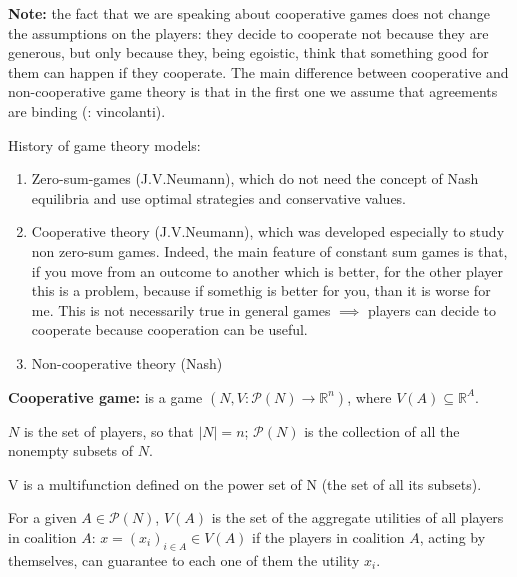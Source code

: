 
%



\bigskip
\noindent \textbf{Note:} the fact that we are speaking about cooperative 
games does not change the assumptions on the players: they decide to 
cooperate not because they are generous, but only because they, being 
egoistic, think that something good for them can happen if they cooperate. 
The main difference between cooperative and non-cooperative game theory is that 
in the first one we assume that agreements are binding (: vincolanti).

\noindent History of game theory models:
\begin{enumerate}
	\item Zero-sum-games (J.V.Neumann), which do not need the concept of 
		Nash equilibria and use optimal strategies and conservative 
		values.
	\item Cooperative theory (J.V.Neumann), which was developed especially 
		to study non zero-sum games. Indeed, the main feature of 
		constant sum games is that, if you move from an outcome to 
		another which is better, for the other player this is a 
		problem, because if somethig is better for you, than it is 
		worse for me. This is not necessarily true in general games 
		$\implies$ players can decide to cooperate because cooperation can 
		be useful.
	\item Non-cooperative theory (Nash)
\end{enumerate}

\bigskip
\noindent \textbf{Cooperative game:} is a game $(N,V: \mathcal{P}(N) \rightarrow \mathbb{R}^n)$, where $V(A) \subseteq \mathbb{R}^A$.

\noindent $N$ is the set of players, so that $|N| = n$; $\mathcal{P}(N)$ is the collection of all the nonempty subsets of $N$.

\noindent V is a multifunction defined on the power set of N (the set of all 
its subsets).

\noindent For a given $A \in \mathcal{P}(N)$, $V(A)$ is the set of the aggregate utilities of all players in coalition $A$: $x = (x_i)_{i \in A} \in V(A)$ if the players in coalition $A$, acting by themselves, can guarantee to each one of them the utility $x_i$.

